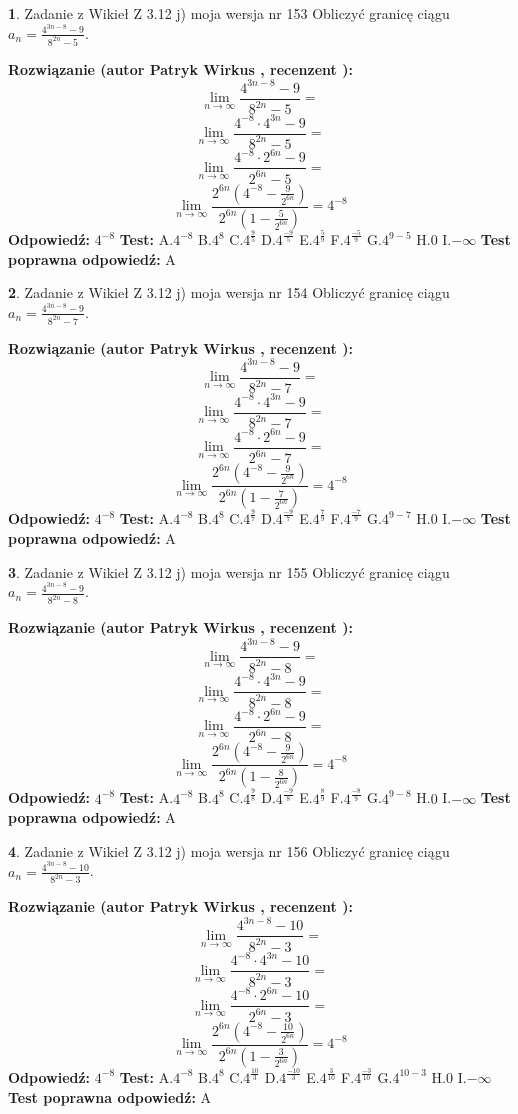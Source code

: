 \documentclass[12pt, a4paper]{article}
\theoremstyle{definition} %
\newtheorem{zad}{}
\newcommand{\zadStart}[1]{\begin{zad}#1\newline}
\newcommand{\zadStop}{\end{zad}}
\newcommand{\rozwStart}[2]{\noindent \textbf{Rozwiązanie (autor #1 , recenzent #2): }\newline}
\newcommand{\rozwStop}{\newline}
\newcommand{\odpStart}{\noindent \textbf{Odpowiedź:}\newline}
\newcommand{\odpStop}{\newline}
\newcommand{\testStart}{\noindent \textbf{Test:}\newline}
\newcommand{\testStop}{\newline}
\newcommand{\kluczStart}{\noindent \textbf{Test poprawna odpowiedź:}\newline}
\newcommand{\kluczStop}{\newline}
\begin{document}
\zadStart{Zadanie z Wikieł Z 3.12 j) moja wersja nr 153}
Obliczyć granicę ciągu $a_{n}=\frac{4^{3n-8}-9}{8^{2n}-5}$.
\zadStop
\rozwStart{Patryk Wirkus}{}
$$\lim\limits_{n\to\infty}\frac{4^{3n-8}-9}{8^{2n}-5}=$$
$$\lim\limits_{n\to\infty}\frac{4^{-8} \cdot 4^{3n}-9}{8^{2n}-5}=$$
$$\lim\limits_{n\to\infty}\frac{4^{-8} \cdot 2^{6n}-9}{2^{6n}-5}=$$
$$\lim\limits_{n\to\infty}\frac{2^{6n}(4^{-8} - \frac{9}{2^{6n}})}{2^{6n}(1-\frac{5}{2^{6n}})}= 4^{-8}$$
\rozwStop
\odpStart
$4^{-8}$
\odpStop
\testStart
A.$4^{-8}$
B.$4^{8}$
C.$4^{\frac{9}{5}}$
D.$4^{\frac{-9}{5}}$
E.$4^{\frac{5}{9}}$
F.$4^{\frac{-5}{9}}$
G.$4^{9-5}$
H.$0$
I.$-\infty$
\testStop
\kluczStart
A
\kluczStop



\zadStart{Zadanie z Wikieł Z 3.12 j) moja wersja nr 154}
Obliczyć granicę ciągu $a_{n}=\frac{4^{3n-8}-9}{8^{2n}-7}$.
\zadStop
\rozwStart{Patryk Wirkus}{}
$$\lim\limits_{n\to\infty}\frac{4^{3n-8}-9}{8^{2n}-7}=$$
$$\lim\limits_{n\to\infty}\frac{4^{-8} \cdot 4^{3n}-9}{8^{2n}-7}=$$
$$\lim\limits_{n\to\infty}\frac{4^{-8} \cdot 2^{6n}-9}{2^{6n}-7}=$$
$$\lim\limits_{n\to\infty}\frac{2^{6n}(4^{-8} - \frac{9}{2^{6n}})}{2^{6n}(1-\frac{7}{2^{6n}})}= 4^{-8}$$
\rozwStop
\odpStart
$4^{-8}$
\odpStop
\testStart
A.$4^{-8}$
B.$4^{8}$
C.$4^{\frac{9}{7}}$
D.$4^{\frac{-9}{7}}$
E.$4^{\frac{7}{9}}$
F.$4^{\frac{-7}{9}}$
G.$4^{9-7}$
H.$0$
I.$-\infty$
\testStop
\kluczStart
A
\kluczStop



\zadStart{Zadanie z Wikieł Z 3.12 j) moja wersja nr 155}
Obliczyć granicę ciągu $a_{n}=\frac{4^{3n-8}-9}{8^{2n}-8}$.
\zadStop
\rozwStart{Patryk Wirkus}{}
$$\lim\limits_{n\to\infty}\frac{4^{3n-8}-9}{8^{2n}-8}=$$
$$\lim\limits_{n\to\infty}\frac{4^{-8} \cdot 4^{3n}-9}{8^{2n}-8}=$$
$$\lim\limits_{n\to\infty}\frac{4^{-8} \cdot 2^{6n}-9}{2^{6n}-8}=$$
$$\lim\limits_{n\to\infty}\frac{2^{6n}(4^{-8} - \frac{9}{2^{6n}})}{2^{6n}(1-\frac{8}{2^{6n}})}= 4^{-8}$$
\rozwStop
\odpStart
$4^{-8}$
\odpStop
\testStart
A.$4^{-8}$
B.$4^{8}$
C.$4^{\frac{9}{8}}$
D.$4^{\frac{-9}{8}}$
E.$4^{\frac{8}{9}}$
F.$4^{\frac{-8}{9}}$
G.$4^{9-8}$
H.$0$
I.$-\infty$
\testStop
\kluczStart
A
\kluczStop



\zadStart{Zadanie z Wikieł Z 3.12 j) moja wersja nr 156}
Obliczyć granicę ciągu $a_{n}=\frac{4^{3n-8}-10}{8^{2n}-3}$.
\zadStop
\rozwStart{Patryk Wirkus}{}
$$\lim\limits_{n\to\infty}\frac{4^{3n-8}-10}{8^{2n}-3}=$$
$$\lim\limits_{n\to\infty}\frac{4^{-8} \cdot 4^{3n}-10}{8^{2n}-3}=$$
$$\lim\limits_{n\to\infty}\frac{4^{-8} \cdot 2^{6n}-10}{2^{6n}-3}=$$
$$\lim\limits_{n\to\infty}\frac{2^{6n}(4^{-8} - \frac{10}{2^{6n}})}{2^{6n}(1-\frac{3}{2^{6n}})}= 4^{-8}$$
\rozwStop
\odpStart
$4^{-8}$
\odpStop
\testStart
A.$4^{-8}$
B.$4^{8}$
C.$4^{\frac{10}{3}}$
D.$4^{\frac{-10}{3}}$
E.$4^{\frac{3}{10}}$
F.$4^{\frac{-3}{10}}$
G.$4^{10-3}$
H.$0$
I.$-\infty$
\testStop
\kluczStart
A
\kluczStop
\end{document}
